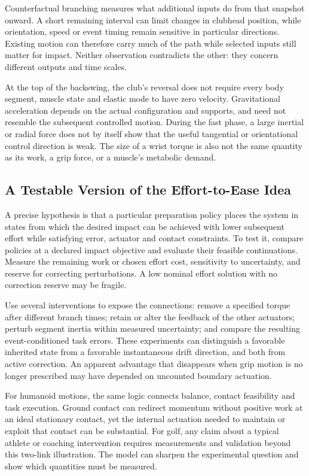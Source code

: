 Counterfactual branching measures what additional inputs do from that snapshot onward. A short remaining interval can limit changes in clubhead position, while orientation, speed or event timing remain sensitive in particular directions. Existing motion can therefore carry much of the path while selected inputs still matter for impact. Neither observation contradicts the other: they concern different outputs and time scales.

At the top of the backswing, the club's reversal does not require every body segment, muscle state and elastic mode to have zero velocity. Gravitational acceleration depends on the actual configuration and supports, and need not resemble the subsequent controlled motion. During the fast phase, a large inertial or radial force does not by itself show that the useful tangential or orientational control direction is weak. The size of a wrist torque is also not the same quantity as its work, a grip force, or a muscle's metabolic demand.

\subsection{A Testable Version of the Effort-to-Ease Idea}
A precise hypothesis is that a particular preparation policy places the system in states from which the desired impact can be achieved with lower subsequent effort while satisfying error, actuator and contact constraints. To test it, compare policies at a declared impact objective and evaluate their feasible continuations. Measure the remaining work or chosen effort cost, sensitivity to uncertainty, and reserve for correcting perturbations. A low nominal effort solution with no correction reserve may be fragile.

Use several interventions to expose the connections: remove a specified torque after different branch times; retain or alter the feedback of the other actuators; perturb segment inertia within measured uncertainty; and compare the resulting event-conditioned task errors. These experiments can distinguish a favorable inherited state from a favorable instantaneous drift direction, and both from active correction. An apparent advantage that disappears when grip motion is no longer prescribed may have depended on uncounted boundary actuation.

For humanoid motions, the same logic connects balance, contact feasibility and task execution. Ground contact can redirect momentum without positive work at an ideal stationary contact, yet the internal actuation needed to maintain or exploit that contact can be substantial. For golf, any claim about a typical athlete or coaching intervention requires measurements and validation beyond this two-link illustration. The model can sharpen the experimental question and show which quantities must be measured.

